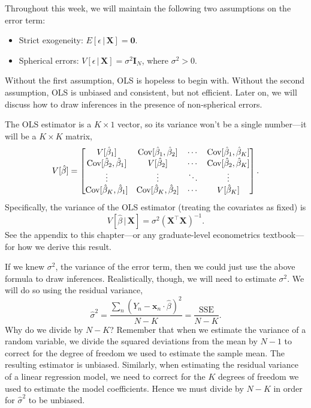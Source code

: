 \documentclass[12pt,oneside,openany]{book}
\begin{document}
Throughout this week, we will maintain the following two assumptions on
the error term:

\begin{itemize}
\item
  Strict exogeneity: \(E[\epsilon \,|\, \mathbf{X}] = \mathbf{0}\).
\item
  Spherical errors:
  \(V[\epsilon \,|\, \mathbf{X}] = \sigma^2 \mathbf{I}_N\), where
  \(\sigma^2 > 0\).
\end{itemize}

Without the first assumption, OLS is hopeless to begin with. Without the
second assumption, OLS is unbiased and consistent, but not efficient.
Later on, we will discuss how to draw inferences in the presence of
non-spherical errors.

The OLS estimator is a \(K \times 1\) vector, so its variance won't be a
single number---it will be a \(K \times K\) matrix, \[
V[\hat{\beta}] = \begin{bmatrix}
  V[\hat{\beta}_1] & \mathop{\rm Cov}\nolimits[\hat{\beta}_1, \hat{\beta}_2] & \cdots & \mathop{\rm Cov}\nolimits[\hat{\beta}_1, \hat{\beta}_K] \\
  \mathop{\rm Cov}\nolimits[\hat{\beta}_2, \hat{\beta}_1] & V[\hat{\beta}_2] & \cdots & \mathop{\rm Cov}\nolimits[\hat{\beta}_2, \hat{\beta}_K] \\
  \vdots & \vdots & \ddots & \vdots \\
  \mathop{\rm Cov}\nolimits[\hat{\beta}_K, \hat{\beta}_1] & \mathop{\rm Cov}\nolimits[\hat{\beta}_K, \hat{\beta}_2] & \cdots & V[\hat{\beta}_K] \\
\end{bmatrix}.
\] Specifically, the variance of the OLS estimator (treating the
covariates as fixed) is \[
V[\hat{\beta} \,|\, \mathbf{X}] = \sigma^2 (\mathbf{X}^\top \mathbf{X})^{-1}.
\] See the appendix to this chapter---or any graduate-level econometrics
textbook---for how we derive this result.

If we knew \(\sigma^2\), the variance of the error term, then we could
just use the above formula to draw inferences. Realistically, though, we
will need to estimate \(\sigma^2\). We will do so using the residual
variance, \[
\hat{\sigma}^2
= \frac{\sum_n (Y_n - \mathbf{x}_n \cdot \hat{\beta})^2}{N - K}
= \frac{\text{SSE}}{N - K}.
\] Why do we divide by \(N - K\)? Remember that when we estimate the
variance of a random variable, we divide the squared deviations from the
mean by \(N - 1\) to correct for the degree of freedom we used to
estimate the sample mean. The resulting estimator is unbiased.
Similarly, when estimating the residual variance of a linear regression
model, we need to correct for the \(K\) degrees of freedom we used to
estimate the model coefficients. Hence we must divide by \(N - K\) in
order for \(\hat{\sigma}^2\) to be unbiased.
\end{document}
